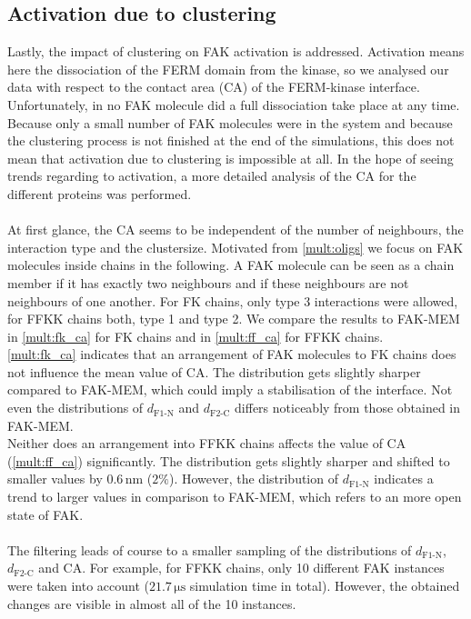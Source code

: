 \subsection{Activation due to clustering}
Lastly, the impact of clustering on FAK activation is addressed. Activation means here the dissociation of the FERM domain from the kinase, so we analysed our data with respect to the contact area (CA) of the FERM-kinase interface.\\
Unfortunately, in no FAK molecule did a full dissociation take place at any time. Because only a small number of FAK molecules were in the system and because the clustering process is not finished at the end of the simulations, this does not mean that activation due to clustering is impossible at all. In the hope of seeing trends regarding to activation, a more detailed analysis of the CA for the different proteins was performed.\\
\\
At first glance, the CA seems to be independent of the number of neighbours, the interaction type and the clustersize. Motivated from \autoref{mult:oligs} we focus on FAK molecules inside chains in the following. A FAK molecule can be seen as a chain member if it has exactly two neighbours and if these neighbours are not neighbours of one another. For FK chains, only type 3 interactions were allowed, for FFKK chains both, type 1 and type 2. We compare the results to FAK-MEM in \autoref{mult:fk_ca} for FK chains and in \autoref{mult:ff_ca} for FFKK chains.\\
\autoref{mult:fk_ca} indicates that an arrangement of FAK molecules to FK chains does not influence the mean value of CA. The distribution gets slightly sharper compared to FAK-MEM, which could imply a stabilisation of the interface. Not even the distributions of $d_\text{F1-N}$ and $d_\text{F2-C}$ differs noticeably from those obtained in FAK-MEM.\\
Neither does an arrangement into FFKK chains affects the value of CA (\autoref{mult:ff_ca}) significantly. The distribution gets slightly sharper and shifted to smaller values by $0.6\,\si{\nano\metre}$ ($2\%$). However, the distribution of $d_\text{F1-N}$ indicates a trend to larger values in comparison to FAK-MEM, which refers to an more open state of FAK.\\
\\
The filtering leads of course to a smaller sampling of the distributions of $d_\text{F1-N}$, $d_\text{F2-C}$ and CA. For example, for FFKK chains, only 10 different FAK instances were taken into account ($21.7\,\si{\micro\second}$ simulation time in total). However, the obtained changes are visible in almost all of the 10 instances.
